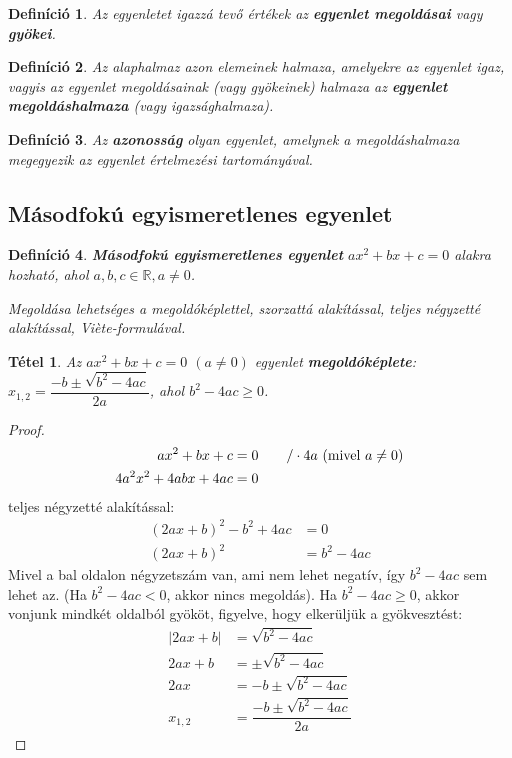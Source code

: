 \documentclass[12pt,a4paper]{article}
\newtheorem{theorem}{Tétel} [section]
\newtheorem{definition}{Definíció} [section]
\begin{document}
\begin{definition}
Az egyenletet igazzá tevő értékek az \textbf{egyenlet megoldásai} vagy \textbf{gyökei}.
\end{definition}

\begin{definition}
Az alaphalmaz azon elemeinek halmaza, amelyekre az egyenlet igaz, vagyis az egyenlet megoldásainak (vagy gyökeinek) halmaza az \textbf{egyenlet megoldáshalmaza} (vagy igazsághalmaza).
\end{definition}

\begin{definition}
Az \textbf{azonosság} olyan egyenlet, amelynek a megoldáshalmaza megegyezik az egyenlet értelmezési tartományával.
\end{definition}

\subsection{Másodfokú egyismeretlenes egyenlet}
\begin{definition}
\textbf{Másodfokú egyismeretlenes egyenlet} $ax^2 + bx + c = 0$ alakra hozható, ahol $a, b, c \in \mathbb{R}, a \neq 0$.

Megoldása lehetséges a megoldóképlettel, szorzattá alakítással, teljes négyzetté alakítással, Viète-formulával.
\end{definition}

\begin{theorem}
Az $ax^2 + bx + c = 0$ $(a \neq 0)$ egyenlet \textbf{megoldóképlete}: $x_{1,2}=\dfrac{-b\pm \sqrt{b^2-4ac}}{2a}$, ahol $b^2-4ac \geq 0$.
\end{theorem}
\begin{proof}
\begin{align*}
ax^2+bx+c&=0 \hspace{20px}/\cdot 4a \text{ (mivel }a\neq 0 \text{)} \\
4a^2x^2+4abx+4ac&=0
\end{align*}
teljes négyzetté alakítással:
\begin{align*}
(2ax+b)^2-b^2+4ac&=0 \\
(2ax+b)^2&=b^2-4ac
\end{align*}
Mivel a bal oldalon négyzetszám van, ami nem lehet negatív, így $b^2 - 4ac$ sem lehet az. (Ha $b^2 - 4ac<0$, akkor nincs megoldás). Ha $b^2 - 4ac \geq 0$, akkor vonjunk mindkét oldalból gyököt, figyelve, hogy elkerüljük a gyökvesztést:
\begin{align*}
|2ax+b|&=\sqrt{b^2-4ac} \\
2ax+b&=\pm \sqrt{b^2-4ac} \\
2ax&=-b\pm \sqrt{b^2-4ac} \\
x_{1,2}&=\dfrac{-b\pm \sqrt{b^2-4ac}}{2a}
\end{align*}
\end{proof}
\end{document}

